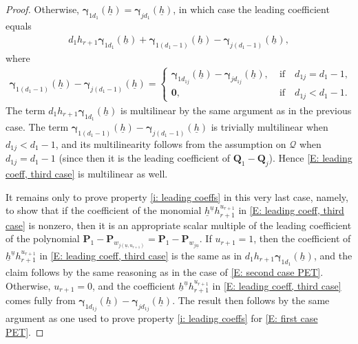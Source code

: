 \documentclass[11pt]{amsart}
\theoremstyle{definition}
\newcommand{\CQ}{{\mathcal Q}}
\newcommand{\p}{{\textbf{P}}}
\newcommand{\q}{{\textbf{Q}}}
\newcommand{\bgamma}{{\boldsymbol{\gamma}}}
\newcommand{\uh}{{\underline{h}}}
\newcommand{\uu}{{\underline{u}}}
\begin{document}
\begin{proof}
        Otherwise, $\bgamma_{1 d_1}(\uh)=\bgamma_{jd_1}(\uh)$, in which case the leading coefficient equals 
        \begin{align}\label{E: leading coeff, third case}
            d_1h_{r+1} \bgamma_{1d_1}(\uh) + \bgamma_{1 (d_1-1)}(\uh)-\bgamma_{j(d_1-1)}(\uh),
        \end{align}
        where 
        \begin{align*}
            \bgamma_{1 (d_1-1)}(\uh)-\bgamma_{j(d_1-1)}(\uh) = \begin{cases} \bgamma_{1d_{1j}}(\uh)-\bgamma_{jd_{1j}}(\uh),\; &\textrm{if}\quad d_{1j} = d_1-1,\\
            \mathbf{0},\; &\textrm{if}\quad d_{1j}<d_1-1.
            \end{cases}
        \end{align*}
        The term $d_1h_{r+1} \bgamma_{1d_1}(\uh)$ is multilinear by the same argument as in the previous case.  The term $\bgamma_{1 (d_1-1)}(\uh)-\bgamma_{j(d_1-1)}(\uh)$ is trivially multilinear when $d_{1j}<d_1-1$, and its multilinearity follows from the assumption on $\CQ$ when $d_{1j} = d_1-1$ (since then it is the leading coefficient of $\q_1 - \q_j$). Hence \eqref{E: leading coeff, third case} is multilinear as well. 

        It remains only to prove property \eqref{i: leading coeffs} in this very last case, namely, to show that if the coefficient of the monomial $\uh^\uu h_{r+1}^{u_{r+1}}$ in \eqref{E: leading coeff, third case} is nonzero, then it is an appropriate scalar multiple of the leading coefficient of the polynomial $\p_1 - \p_{w_{j(\uu, u_{r+1})}} = \p_1 - \p_{w_{j\uu}}$. If $u_{r+1}=1$, then the coefficient of $\uh^\uu h_{r+1}^{u_{r+1}}$ in \eqref{E: leading coeff, third case} is the same as in $d_1h_{r+1} \bgamma_{1d_1}(\uh)$, and the claim follows by the same reasoning as in the case of \eqref{E: second case PET}. Otherwise, $u_{r+1}=0$, and the coefficient $\uh^\uu h_{r+1}^{u_{r+1}}$ in \eqref{E: leading coeff, third case} comes fully from $\bgamma_{1d_{1j}}(\uh)-\bgamma_{jd_{1j}}(\uh)$. The result then follows by the same argument as one used to prove property \eqref{i: leading coeffs} for \eqref{E: first case PET}.
    \end{proof}
\end{document}
